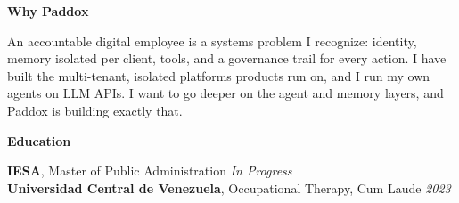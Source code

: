 \documentclass[10pt]{article}
\newcommand{\sectiontitle}[1]{%
    \vspace{5pt}
    \begin{center}
        \textbf{#1}
    \end{center}
    \vspace{-6pt}
}
\begin{document}
\sectiontitle{Why Paddox}
An accountable digital employee is a systems problem I recognize: identity, memory isolated per client, tools, and a governance trail for every action. I have built the multi-tenant, isolated platforms products run on, and I run my own agents on LLM APIs. I want to go deeper on the agent and memory layers, and Paddox is building exactly that.

\sectiontitle{Education}
\textbf{IESA}, Master of Public Administration \hfill \textit{In Progress} \\
\textbf{Universidad Central de Venezuela}, Occupational Therapy, Cum Laude \hfill \textit{2023}
\end{document}
